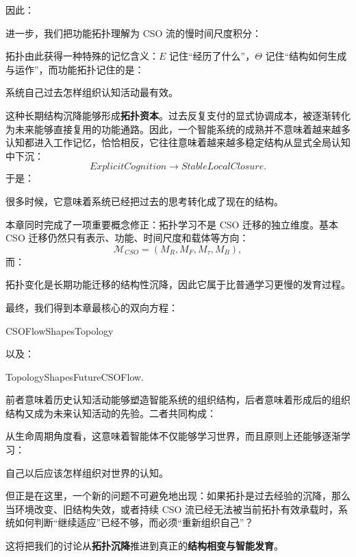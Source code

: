 因此：
\begin{statementbox}
\centering
{}
\end{statementbox}

进一步，我们把功能拓扑理解为 CSO 流的慢时间尺度积分：
\begin{statementbox}
\centering
{}
\end{statementbox}
拓扑由此获得一种特殊的记忆含义：$E$ 记住``经历了什么''，$\Theta$ 记住``结构如何生成与运作''，而功能拓扑记住的是：
\begin{statementbox}
系统自己过去怎样组织认知活动最有效。
\end{statementbox}

这种长期结构沉降能够形成\textbf{拓扑资本}。过去反复支付的显式协调成本，被逐渐转化为未来能够直接复用的功能通路。因此，一个智能系统的成熟并不意味着越来越多认知都进入工作记忆，恰恰相反，它往往意味着越来越多稳定结构从显式全局认知中下沉：
\[
ExplicitCognition
\rightarrow
StableLocalClosure.
\]
于是：
\begin{statementbox}
\centering
{}
\end{statementbox}
很多时候，它意味着系统已经把过去的思考转化成了现在的结构。

本章同时完成了一项重要概念修正：拓扑学习不是 CSO 迁移的独立维度。基本 CSO 迁移仍然只有表示、功能、时间尺度和载体等方向：
\[
\mathcal M_{CSO}
=
(M_R,M_F,M_\tau,M_B),
\]
而：
\begin{statementbox}
\centering
{}
\end{statementbox}
拓扑变化是长期功能迁移的结构性沉降，因此它属于比普通学习更慢的发育过程。

最终，我们得到本章最核心的双向方程：
\begin{statementbox}
CSOFlowShapesTopology
\end{statementbox}
以及：
\begin{statementbox}
TopologyShapesFutureCSOFlow.
\end{statementbox}
前者意味着历史认知活动能够塑造智能系统的组织结构，后者意味着形成后的组织结构又成为未来认知活动的先验。二者共同构成：
\begin{statementbox}
\centering
{}
\end{statementbox}

从生命周期角度看，这意味着智能体不仅能够学习世界，而且原则上还能够逐渐学习：
\begin{proposition*}
自己以后应该怎样组织对世界的认知。
\end{proposition*}

但正是在这里，一个新的问题不可避免地出现：如果拓扑是过去经验的沉降，那么当环境改变、旧结构失效，或者持续 CSO 流已经无法被当前拓扑有效承载时，系统如何判断``继续适应''已经不够，而必须``重新组织自己''？

这将把我们的讨论从\textbf{拓扑沉降}推进到真正的\textbf{结构相变与智能发育}。
